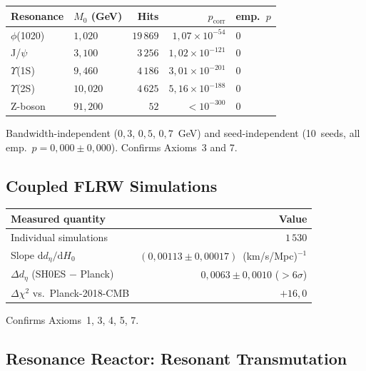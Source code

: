 \documentclass[a4paper,11pt]{article}
\begin{document}
	\begin{center}
		\begin{tabular}{llrrl}
			\hline
			\textbf{Resonance} & $M_0$ (GeV)
			& \textbf{Hits} & $p_{\mathrm{corr}}$
			& \textbf{emp.\ $p$} \\
			\hline
			$\phi$(1020) & $1{,}020$ & $19\,869$
			& $1{,}07 \times 10^{-54}$ & $0$ \\
			J/$\psi$ & $3{,}100$ & $3\,256$
			& $1{,}02 \times 10^{-121}$ & $0$ \\
			$\Upsilon$(1S) & $9{,}460$ & $4\,186$
			& $3{,}01 \times 10^{-201}$ & $0$ \\
			$\Upsilon$(2S) & $10{,}020$ & $4\,625$
			& $5{,}16 \times 10^{-188}$ & $0$ \\
			Z-boson & $91{,}200$ & $52$
			& $< 10^{-300}$ & $0$ \\
			\hline
		\end{tabular}
	\end{center}
	
	Bandwidth-independent ($0{,}3$, $0{,}5$,
	$0{,}7$~GeV) and seed-independent
	(10~seeds, all emp.\ $p = 0{,}000 \pm 0{,}000$).
	Confirms Axioms~3 and 7.
	
	\subsection{Coupled FLRW Simulations}
	
	\begin{center}
		\begin{tabular}{lr}
			\hline
			\textbf{Measured quantity} & \textbf{Value} \\
			\hline
			Individual simulations & $1\,530$ \\
			Slope $\mathrm{d}d_\eta / \mathrm{d}H_0$
			& $(0{,}00113 \pm 0{,}00017)$~(km/s/Mpc)$^{-1}$ \\
			$\Delta d_\eta$ (SH0ES $-$ Planck)
			& $0{,}0063 \pm 0{,}0010$ ($>6\sigma$) \\
			$\Delta\chi^2$ vs.\ Planck-2018-CMB
			& $+16{,}0$ \\
			\hline
		\end{tabular}
	\end{center}
	
	Confirms Axioms~1, 3, 4, 5, 7.
	
	\subsection{Resonance Reactor: Resonant Transmutation}
	
\end{document}
